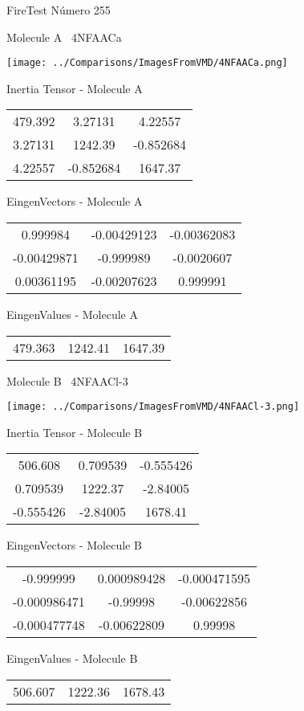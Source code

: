 \vtab[-3cm]
\begin{center}
{\large FireTest \tab Número 255}
\end{center}
\begin{multicols}{2}
\begin{center}

Molecule A \
4NFAACa

\texttt{[image: ../Comparisons/ImagesFromVMD/4NFAACa.png]}

Inertia Tensor - Molecule A \\
\begin{tabular}{|c c c|}
479.392	 & 	3.27131	 & 	4.22557	 \\
3.27131	 & 	1242.39	 & 	-0.852684	 \\
4.22557	 & 	-0.852684	 & 	1647.37
\end{tabular}

\vtab
 EingenVectors - Molecule A     \\
\begin{tabular}{|c c c|}
0.999984	 & 	-0.00429123	 & 	-0.00362083	 \\
-0.00429871	 & 	-0.999989	 & 	-0.0020607	 \\
0.00361195	 & 	-0.00207623	 & 	0.999991
\end{tabular}

\vtab
 EingenValues - Molecule A     \\
\begin{tabular}{|c c c|}
479.363	 & 	1242.41	 & 	1647.39	 \\
\end{tabular}
\columnbreak

Molecule B \
4NFAACl-3

\texttt{[image: ../Comparisons/ImagesFromVMD/4NFAACl-3.png]}

Inertia Tensor - Molecule B \\
\begin{tabular}{|c c c|}
506.608	 & 	0.709539	 & 	-0.555426	 \\
0.709539	 & 	1222.37	 & 	-2.84005	 \\
-0.555426	 & 	-2.84005	 & 	1678.41
\end{tabular}

\vtab
 EingenVectors - Molecule B     \\
\begin{tabular}{|c c c|}
-0.999999	 & 	0.000989428	 & 	-0.000471595	 \\
-0.000986471	 & 	-0.99998	 & 	-0.00622856	 \\
-0.000477748	 & 	-0.00622809	 & 	0.99998
\end{tabular}

\vtab
 EingenValues - Molecule B     \\
\begin{tabular}{|c c c|}
506.607	 & 	1222.36	 & 	1678.43	 \\
\end{tabular}

\end{center}
\end{multicols}

